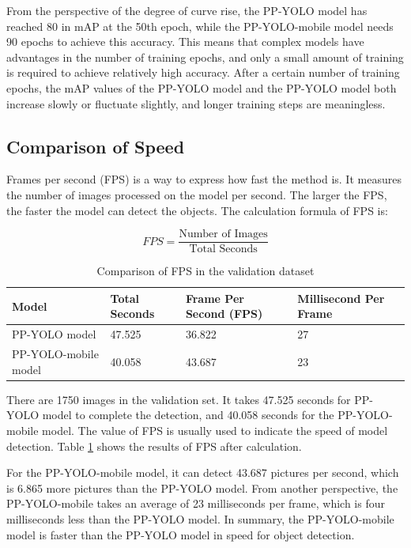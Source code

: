 \documentclass[journal,article,submit,moreauthors,pdftex]{Definitions/mdpi}
\begin{document}
From the perspective of the degree of curve rise, the PP-YOLO model has reached 80 in mAP at the 50th epoch, while the PP-YOLO-mobile model needs 90 epochs to achieve this accuracy. This means that complex models have advantages in the number of training epochs, and only a small amount of training is required to achieve relatively high accuracy. After a certain number of training epochs, the mAP values of the PP-YOLO model and the PP-YOLO model both increase slowly or fluctuate slightly, and longer training steps are meaningless.



\subsection{Comparison of Speed}

Frames per second (FPS) is a way to express how fast the method is. It measures the number of images processed on the model per second. The larger the FPS, the faster the model can detect the objects. The calculation formula of FPS is:

\begin{equation} 
{FPS} = \frac {\text{Number\ of\ Images}} {\text{Total\ Seconds}}
\end{equation}

\begin{table}[htbp]
\centering
\caption{Comparison of FPS in the validation dataset}
\begin{tabular}{llll} 
\toprule
\textbf{Model}&\textbf{Total Seconds}&\textbf{Frame Per Second (FPS)}&\textbf{Millisecond Per Frame}\\
\midrule
PP-YOLO model & 47.525&36.822&27\\
PP-YOLO-mobile model&40.058&43.687&23\\
\bottomrule
\end{tabular}
\label{tbl:Comparison of FPS in the validation dataset}
\end{table}

There are 1750 images in the validation set. It takes 47.525 seconds for PP-YOLO model to complete the detection, and 40.058 seconds for the PP-YOLO-mobile model. The value of FPS is usually used to indicate the speed of model detection. Table \ref{tbl:Comparison of FPS in the validation dataset} shows the results of FPS after calculation.

For the PP-YOLO-mobile model, it can detect 43.687 pictures per second, which is 6.865 more pictures than the PP-YOLO model. From another perspective, the PP-YOLO-mobile takes an average of 23 milliseconds per frame, which is four milliseconds less than the PP-YOLO model. In summary, the PP-YOLO-mobile model is faster than the PP-YOLO model in speed for object detection.
\end{document}
